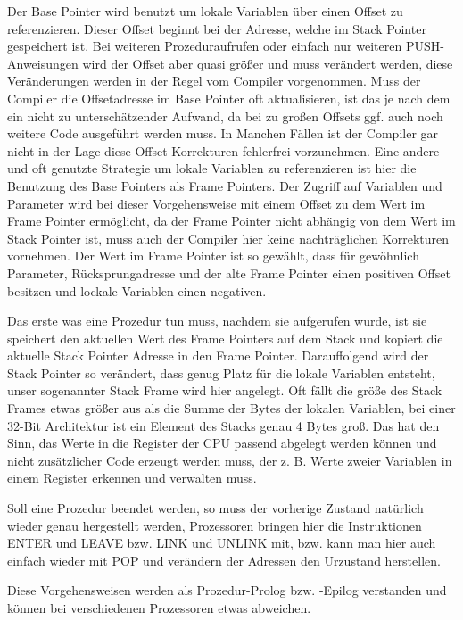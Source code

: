 \documentclass[12pt]{book}
\begin{document}
Der Base Pointer wird benutzt um lokale Variablen über einen Offset zu
referenzieren. Dieser Offset beginnt bei der Adresse, welche im Stack Pointer
gespeichert ist. Bei weiteren Prozeduraufrufen oder einfach nur weiteren
PUSH-Anweisungen wird der Offset aber quasi größer und muss verändert werden,
diese Veränderungen werden in der Regel vom Compiler vorgenommen. Muss der
Compiler die Offsetadresse im Base Pointer oft aktualisieren, ist das je nach
dem ein nicht zu unterschätzender Aufwand, da bei zu großen Offsets ggf. auch
noch weitere Code ausgeführt werden muss. In Manchen Fällen ist der Compiler gar
nicht in der Lage diese Offset-Korrekturen fehlerfrei vorzunehmen. Eine andere
und oft genutzte Strategie um lokale Variablen zu referenzieren ist hier die
Benutzung des Base Pointers als Frame Pointers. Der Zugriff auf Variablen und
Parameter wird bei dieser Vorgehensweise mit einem Offset zu dem Wert im Frame
Pointer ermöglicht, da der Frame Pointer nicht abhängig von dem Wert im Stack
Pointer ist, muss auch der Compiler hier keine nachträglichen Korrekturen
vornehmen. Der Wert im Frame Pointer ist so gewählt, dass für gewöhnlich
Parameter, Rücksprungadresse und der alte Frame Pointer einen positiven Offset
besitzen und lockale Variablen einen negativen.

Das erste was eine Prozedur tun muss, nachdem sie aufgerufen wurde, ist sie
speichert den aktuellen Wert des Frame Pointers auf dem Stack und kopiert die
aktuelle Stack Pointer Adresse in den Frame Pointer. Darauffolgend wird der
Stack Pointer so verändert, dass genug Platz für die lokale Variablen entsteht,
unser sogenannter Stack Frame wird hier angelegt. Oft fällt die größe des Stack
Frames etwas größer aus als die Summe der Bytes der lokalen Variablen, bei einer
32-Bit Architektur ist ein Element des Stacks genau 4 Bytes groß. Das hat den
Sinn, das Werte in die Register der CPU passend abgelegt werden können und nicht
zusätzlicher Code erzeugt werden muss, der z. B. Werte zweier Variablen in einem
Register erkennen und verwalten muss.

Soll eine Prozedur beendet werden, so muss der vorherige Zustand natürlich
wieder genau hergestellt werden, Prozessoren bringen hier die Instruktionen
ENTER und LEAVE bzw. LINK und UNLINK mit, bzw. kann man hier auch einfach
wieder mit POP und verändern der Adressen den Urzustand herstellen.

Diese Vorgehensweisen werden als Prozedur-Prolog bzw. -Epilog verstanden und
können bei verschiedenen Prozessoren etwas abweichen.
\end{document}
